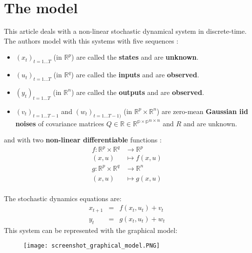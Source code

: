 \section{The model}

This article deals with a non-linear stochastic dynamical system in discrete-time.
The authors model with this systems with five sequences :
\begin{itemize}
  \item $(x_t)_{t=1 \ldots T}$ (in $\mathbb{R}^p$) are called the \textbf{states} and are \textbf{unknown}.
  \item $(u_t)_{t=1 \ldots T}$ (in $\mathbb{R}^q$) are called the \textbf{inputs} and are \textbf{observed}.
  \item $(y_t)_{t=1 \ldots T}$ (in $\mathbb{R}^n$) are called the \textbf{outputs} and are \textbf{observed}.
  \item $(v_t)_{t=1 \ldots T-1}$ and $(w_t)_{t=1 \ldots T-1)}$ (in $\mathbb{R}^p \times \mathbb{R}^n$) are zero-mean \textbf{Gaussian iid noises} of covariance matrices $Q \in \mathbb{R \in \mathbb{R}^{p \times p}}^{n \times n} $ and $R$ and are unknown.
\end{itemize}
and with two \textbf{non-linear differentiable} functions :
\begin{align*}
  f \colon \mathbb{R}^p \times \mathbb{R}^q &\to \mathbb{R}^p\\
  (x,u) &\mapsto f(x, u)\\
  g \colon \mathbb{R}^p \times \mathbb{R}^q &\to \mathbb{R}^n\\
  (x,u) &\mapsto g(x, u)\\
\end{align*}

The stochastic dynamics equations are:
\begin{eqnarray}
  x_{t+1}&=& f(x_t,u_t)+v_t\\
  y_t &=& g(x_t,u_t)+w_t
\end{eqnarray}
This system can be represented with the graphical model:
\begin{figure}[H]
	\texttt{[image: screenshot\_graphical\_model.PNG]}
\end{figure}
